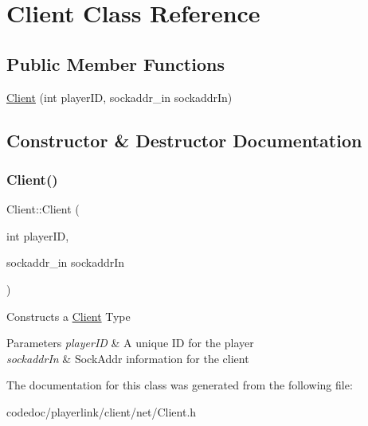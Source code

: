 \hypertarget{classClient}{}\section{Client Class Reference}
\label{classClient}
\subsection*{Public Member Functions}
\begin{DoxyCompactItemize}
\item 
\hyperlink{classClient_ac9c1aed0f03212da6f14813c4eca2069}{Client} (int player\+ID, sockaddr\+\_\+in sockaddr\+In)
\end{DoxyCompactItemize}


\subsection{Constructor \& Destructor Documentation}
\mbox{\label{classClient_ac9c1aed0f03212da6f14813c4eca2069}} 
\subsubsection{\texorpdfstring{Client()}{Client()}}
{\footnotesize\ttfamily Client\+::\+Client (\begin{DoxyParamCaption}\item[{int}]{player\+ID,  }\item[{sockaddr\+\_\+in}]{sockaddr\+In }\end{DoxyParamCaption})}

Constructs a \hyperlink{classClient}{Client} Type 
\begin{DoxyParams}{Parameters}
{\em player\+ID} & A unique ID for the player \\
\hline
{\em sockaddr\+In} & Sock\+Addr information for the client \\
\hline
\end{DoxyParams}


The documentation for this class was generated from the following file\+:\begin{DoxyCompactItemize}
\item 
codedoc/playerlink/client/net/Client.\+h\end{DoxyCompactItemize}
